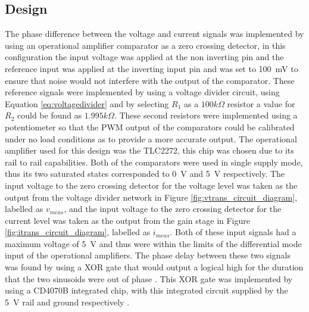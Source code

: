 \subsection{Design} \label{sec:phase_design}
The phase difference between the voltage and current signals was implemented by using an operational amplifier comparator as a zero crossing detector, in this configuration the input voltage was applied at the non inverting pin and the reference input was applied at the inverting input pin and was set to \SI{100}{\milli \volt} \cite{ZeroCrossingDetector} to ensure that noise would not interfere with the output of the comparator. These reference signals were implemented by using a voltage divider circuit, using Equation \ref{eq:voltagedivider} and by selecting $R_1$ as a $100k\Omega$ resistor a value for $R_2$ could be found as $1.995k\Omega$. These second resistors were implemented using a potentiometer so that the PWM output of the comparators could be calibrated under no load conditions as to provide a more accurate output. The operational amplifier used for this design was the TLC2272, this chip was chosen due to its rail to rail capabilities. Both of the comparators were used in single supply mode, thus its two saturated states corresponded to \SI{0}{\volt} and \SI{5}{\volt} respectively. \vspace{4mm} \newline
The input voltage to the zero crossing detector for the voltage level was taken as the output from the voltage divider network in Figure \ref{fig:vtrans_circuit_diagram}, labelled as $v_{meas}$, and the input voltage to the zero crossing detector for the current level was taken as the output from the gain stage in Figure \ref{fig:itrans_circuit_diagram}, labelled as $i_{meas}$. Both of these input signals had a maximum voltage of \SI{5}{\volt} and thus were within the limits of the differential mode input of the operational amplifiers. The phase delay between these two signals was found by using a XOR gate that would output a logical high for the duration that the two sinusoids were out of phase \cite{PWMref}. This XOR gate was implemented by using a CD4070B integrated chip, with this integrated circuit supplied by the \SI{5}{\volt} rail and ground respectively \cite{CD4070B:2003}. \vspace{4mm} \newline
